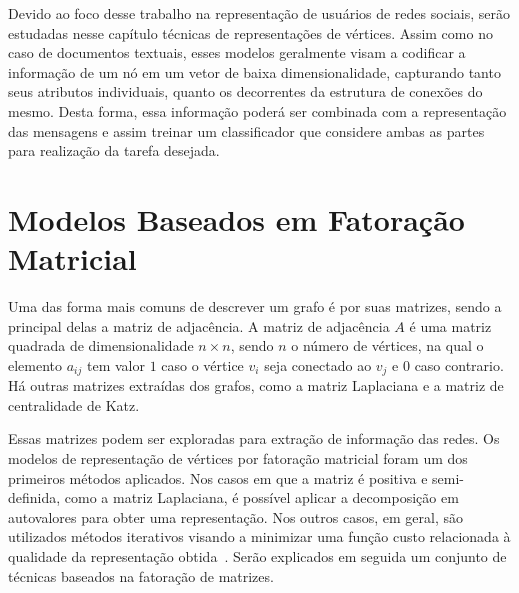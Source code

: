 Devido ao foco desse trabalho na representação de usuários de redes sociais,
serão estudadas nesse capítulo técnicas de representações de vértices.
Assim como no caso de documentos textuais, esses modelos geralmente visam a
codificar a informação de um nó em um vetor de baixa dimensionalidade,
capturando tanto seus atributos individuais, quanto os decorrentes da estrutura
de conexões do mesmo.
Desta forma, essa informação poderá ser combinada com a representação das
mensagens e assim treinar um classificador que considere ambas as partes para
realização da tarefa desejada.





\section{Modelos Baseados em Fatoração Matricial}

Uma das forma mais comuns de descrever um grafo é por suas matrizes, sendo a
principal delas a matriz de adjacência.
A matriz de adjacência $A$ é uma matriz quadrada de dimensionalidade $n \times n$,
sendo $n$ o número de vértices, na qual o elemento $a_{ij}$ tem valor $1$ caso o
vértice $v_i$ seja conectado ao $v_j$ e $0$ caso contrario.
Há outras matrizes extraídas dos grafos, como a matriz Laplaciana e a matriz de
centralidade de Katz.

Essas matrizes podem ser exploradas para extração de informação das redes.
Os modelos de representação de vértices por fatoração matricial foram um dos
primeiros métodos aplicados.
Nos casos em que a matriz é positiva e semi-definida, como a matriz Laplaciana, é
possível aplicar a decomposição em autovalores para obter uma representação.
Nos outros casos, em geral, são utilizados métodos iterativos visando a
minimizar uma função custo relacionada à qualidade da representação obtida~\cite{goyal18}.
Serão explicados em seguida um conjunto de técnicas baseados na fatoração de matrizes.

